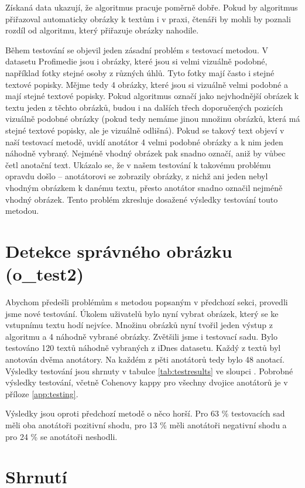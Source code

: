 Získaná data ukazují, že algoritmus pracuje poměrně dobře. Pokud by algoritmus přiřazoval automaticky obrázky k textům i v praxi, čtenáři by mohli by poznali rozdíl od algoritmu, který přiřazuje obrázky nahodile.

Během testování se objevil jeden zásadní problém s testovací metodou. V datasetu Profimedie jsou i obrázky, které jsou si velmi vizuálně podobné, například fotky stejné osoby z různých úhlů. Tyto fotky mají často i stejné textové popisky. Mějme tedy 4 obrázky, které jsou si vizuálně velmi podobné a mají stejné textové popisky. Pokud algoritmus označí jako nejvhodnější obrázek k textu jeden z těchto obrázků, budou i na dalších třech doporučených pozicích vizuálně podobné obrázky (pokud tedy nemáme jinou množinu obrázků, která má stejné textové popisky, ale je vizuálně odlišná). Pokud se takový text objeví v naší testovací metodě, uvidí anotátor 4 velmi podobné obrázky a k nim jeden náhodně vybraný. Nejméně vhodný obrázek pak snadno označí, aniž by vůbec četl anotační text. Ukázalo se, že v našem testování k takovému problému opravdu došlo -- anotátorovi se zobrazily obrázky, z nichž ani jeden nebyl vhodným obrázkem k danému textu, přesto anotátor snadno označil nejméně vhodný obrázek. Tento problém zkresluje dosažené výsledky testování touto metodou.

\section{Detekce správného obrázku (o\_test2)}

Abychom předešli problémům s metodou popsaným v předchozí sekci, provedli jsme nové testování. Úkolem uživatelů bylo nyní vybrat obrázek, který se ke vstupnímu textu hodí nejvíce. Množinu obrázků nyní tvořil jeden výstup z algoritmu a 4 náhodně vybrané obrázky. Zvětšili jsme i testovací sadu. Bylo testováno 120 textů náhodně vybraných z iDnes datasetu. Každý z textů byl anotován dvěma anotátory. Na každém z pěti anotátorů tedy bylo 48 anotací. Výsledky testování jsou shrnuty v tabulce \ref{tab:testresults} ve sloupci . Pobrobné výsledky testování, včetně Cohenovy kappy pro všechny dvojice anotátorů je v příloze \ref{app:testing}.

Výsledky jsou oproti předchozí metodě o něco horší. Pro 63 \% testovacích sad měli oba anotátoři pozitivní shodu, pro 13 \% měli anotátoři negativní shodu a pro 24 \% se anotátoři neshodli.

\section{Shrnutí}

